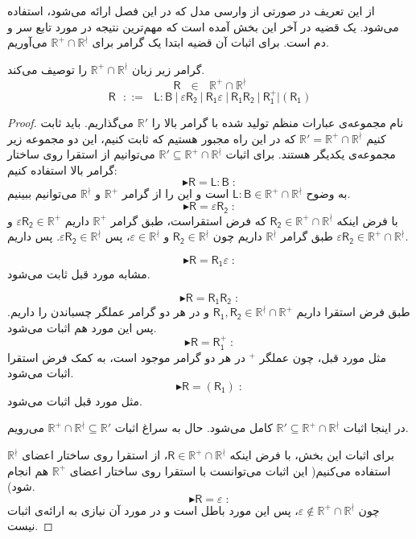 از این تعریف در صورتی از وارسی مدل که در این فصل ارائه می‌شود، استفاده می‌شود. یک قضیه در آخر این بخش آمده است که مهم‌ترین نتیجه در مورد تابع سر و دم است. 
برای اثبات آن قضیه ابتدا یک گرامر برای $\mathbb{R^+ \cap R^\nmid}$ می‌آوریم.
\begin{thm}
	گرامر زیر زبان $\mathbb{R^+ \cap R^\nmid}$ را توصیف می‌کند.
	$$\mathsf{R} \:\:\:\in\:\:\: \mathbb{R^+ \cap R^\nmid}$$
	$$\mathsf{R}\:\:\: ::= \:\:\: \mathsf{L:B} \: |
	\: \mathsf{\varepsilon R_2} \: | \: \mathsf{R_1 \varepsilon} \: |
	\: \mathsf{R_1 R_2} \: | 
	\: \mathsf{R_1^+} | (\mathsf{R_1})$$
\end{thm}
\begin{proof}
	نام مجموعه‌ی عبارات منظم تولید شده با گرامر بالا را $\mathbb{R'}$ می‌گذاریم. باید ثابت کنیم
	$\mathbb{R'=R^+ \cap R^\nmid}$
	که در این راه مجبور هستیم که ثابت کنیم، این دو مجموعه زیر مجموعه‌ی یکدیگر هستند. برای اثبات 
	$\mathbb{R' \subseteq R^+ \cap R^\nmid}$
	می‌توانیم از استقرا روی ساختار گرامر بالا استفاده کنیم:
	$$\blacktriangleright \mathsf{R=L:B}\;:$$
	به وضوح 
	$\mathsf{L:B} \in \mathbb{R^+ \cap R^\nmid}$
	است و این را از گرامر $\mathbb{R^+}$ و $\mathbb{R^\nmid}$ می‌توانیم ببینیم.
	$$\blacktriangleright \mathsf{R=\varepsilon R_2}\;:$$
	با فرض اینکه 
	$\mathsf{R_2} \in \mathbb{R^+ \cap R^\nmid}$
	که فرض استقراست، طبق گرامر $\mathbb{R^+}$ داریم 	$\varepsilon\mathsf{R_2} \in \mathbb{R^+}$ و طبق گرامر $\mathbb{R^\nmid}$ داریم چون 
	$\mathsf{R_2} \in \mathbb{R^\nmid}$
	و
	$\varepsilon \in \mathbb{R^\nmid}$،
	پس 
	$\mathsf{\varepsilon R_2} \in \mathbb{R^\nmid}$.
	پس داریم 
	$\mathsf{\varepsilon R_2} \in \mathbb{R^+ \cap R^\nmid}$.
	
	$$\blacktriangleright \mathsf{R=R_1 \varepsilon}\;:$$
	مشابه مورد قبل ثابت می‌شود.
	
	$$\blacktriangleright \mathsf{R=R_1 R_2}\;:$$
	طبق فرض استقرا داریم 
	$\mathsf{R_1,R_2} \in \mathbb{R^\nmid \cap R^+}$ 
	و در هر دو گرامر عملگر چسباندن را داریم. پس این مورد هم اثبات می‌شود.
	$$\blacktriangleright \mathsf{R=R_1^+}\;:$$
	مثل مورد قبل، چون عملگر $ ^+$ در هر دو گرامر موجود است، به کمک فرض استقرا اثبات می‌شود.
	$$\blacktriangleright \mathsf{R=(R_1)}\;:$$
	مثل مورد قبل اثبات می‌شود.
	
	در اینجا اثبات 
	$\mathbb{R' \subseteq R^+ \cap R^\nmid}$ 
	کامل می‌شود. حال به سراغ اثبات 
	$\mathbb{R^+ \cap R^\nmid \subseteq R'}$
	می‌رویم.
	
	برای اثبات این بخش، با فرض اینکه 
	$\mathsf{R} \in \mathbb{R^+ \cap R^\nmid}$،
	از استقرا روی ساختار اعضای $\mathbb{R^\nmid}$ استفاده می‌کنیم( این اثبات می‌توانست با استقرا روی ساختار اعضای $\mathbb{R^+}$ هم انجام شود).
	$$\blacktriangleright \mathsf{R=\varepsilon}\;:$$
	چون $\varepsilon \notin \mathbb{R^+ \cap R^\nmid}$، پس این مورد باطل است و در مورد آن نیازی به ارائه‌ی اثبات نیست.
	

\end{proof}
